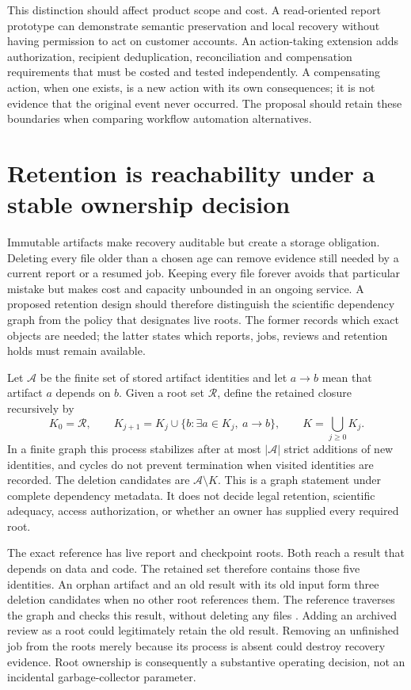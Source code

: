 This distinction should affect product scope and cost. A read-oriented report
prototype can demonstrate semantic preservation and local recovery without
having permission to act on customer accounts. An action-taking extension
adds authorization, recipient deduplication, reconciliation and compensation
requirements that must be costed and tested independently. A compensating
action, when one exists, is a new action with its own consequences; it is
not evidence that the original event never occurred. The proposal should
retain these boundaries when comparing workflow automation alternatives.

\section{Retention is reachability under a stable ownership decision}
\label{exec17:i4-retention}

Immutable artifacts make recovery auditable but create a storage obligation.
Deleting every file older than a chosen age can remove evidence still needed
by a current report or a resumed job. Keeping every file forever avoids that
particular mistake but makes cost and capacity unbounded in an ongoing
service. A proposed retention design should therefore distinguish the
scientific dependency graph from the policy that designates live roots.
The former records which exact objects are needed; the latter states which
reports, jobs, reviews and retention holds must remain available.

Let $\mathcal A$ be the finite set of stored artifact identities and let
$a\to b$ mean that artifact $a$ depends on $b$. Given a root set
$\mathcal R$, define the retained closure recursively by
\begin{equation}
 K_0=\mathcal R,\qquad
 K_{j+1}=K_j\cup\{b:\exists a\in K_j,\ a\to b\},\qquad
 K=\bigcup_{j\geq0}K_j.
 \label{exec17:i4-reachability}
\end{equation}
In a finite graph this process stabilizes after at most $|\mathcal A|$
strict additions of new identities, and cycles do not prevent termination
when visited identities are recorded. The deletion candidates are
$\mathcal A\setminus K$. This is a graph statement under complete dependency
metadata. It does not decide legal retention, scientific adequacy, access
authorization, or whether an owner has supplied every required root.

The exact reference has live report and checkpoint roots. Both reach a result
that depends on data and code. The retained set therefore contains those
five identities. An orphan artifact and an old result with its old input
form three deletion candidates when no other root references them.
The reference traverses the graph and checks this result, without deleting
any files \citep{exec17_integration_review_reference}. Adding an archived
review as a root could legitimately retain the old result. Removing an
unfinished job from the roots merely because its process is absent could
destroy recovery evidence. Root ownership is consequently a substantive
operating decision, not an incidental garbage-collector parameter.

